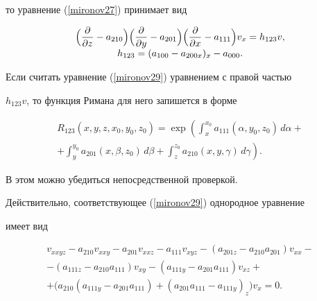 то уравнение (\ref{mironov27}) принимает вид


\begin{equation}\label{mironov29}


\begin{array}{c}


\displaystyle


\Bigl ( \frac{\partial}{\partial z}-a_{210} \Bigr ) 


\Bigl ( \frac{\partial}{\partial y}-a_{201} \Bigr ) 


\Bigl ( \frac{\partial}{\partial x}-a_{111} \Bigr ) v_{x} = h_{123}v, \\


h_{123}=(a_{100}-a_{200x})_{x}-a_{000}.


\end{array}


\end{equation}


Если считать уравнение (\ref{mironov29}) уравнением с правой частью


$h_{123}v$, то функция Римана для него запишется в форме





\begin{multline}\label{mironov30}


R_{123}(x, y, z,x_{0}, y_{0}, z_{0})= \exp\left( \int_{x}^{x_{0}}


a_{111}(\alpha,y_{0}, z_{0})\,d\alpha+ \right.\\


\left.


+\int_{y}^{y_{0}}a_{201}(x,\beta,z_{0})\,d\beta +\int_{z}^{z_{0}}


a_{210}(x,y,\gamma)\,d\gamma \right) .


\end{multline}


В этом можно убедиться непосредственной проверкой.


Действительно, соответствующее (\ref{mironov29}) однородное уравнение


имеет вид


\begin{multline*}


v_{xxyz}-a_{210}v_{xxy}-a_{201}v_{xxz}-a_{111}v_{xyz}


-(a_{201z}-a_{210}a_{201})v_{xx}-\\-(a_{111z}-a_{210}a_{111})v_{xy}


-(a_{111y}-a_{201}a_{111})v_{xz}+\\


+\bigl(a_{210}(a_{111y}-a_{201}a_{111})+(a_{201}a_{111}-a_{111y})_{z}\bigr)


v_{x}=0.


\end{multline*}


